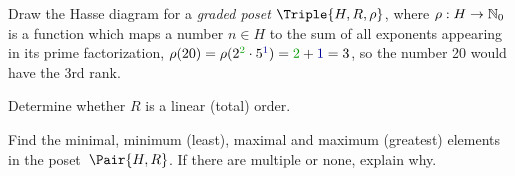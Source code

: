 \documentclass[a4paper,12pt]{article}
\begin{document}
\begin{tasks}
\begin{subtasks}
        \item Draw the Hasse diagram for a \textit{graded poset} $\Triple{H, R, \rho}$, where $\rho : H \to \mathbb{N}_{0}$ is a function which maps a number $n \in H$ to the sum of all exponents appearing in its prime factorization, \eg $\rho(20) = \rho(2^{\mathcolor{my-green}{2}} \cdot 5^{\textcolor{my-blue}{1}}) = \mathcolor{my-green}{2} + \textcolor{my-blue}{1} = 3$, so the number 20 would have the 3rd rank.

        \item Determine whether $R$ is a linear (total) order.

        \item Find the minimal, minimum (least), maximal and maximum (greatest) elements in the poset~$\Pair{H, R}$.
        If there are multiple or none, explain why.

    \end{subtasks}

\end{tasks}
\end{document}
